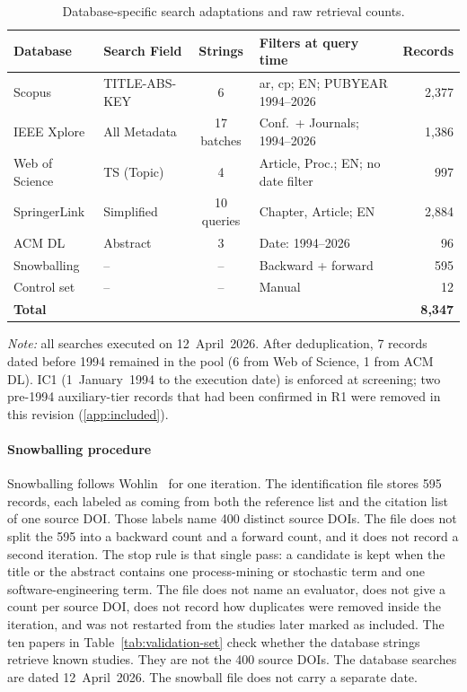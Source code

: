 \begin{table}[htbp]
\centering
\caption{Database-specific search adaptations and raw retrieval counts.}
\label{tab:db-adaptations}
\small
\setlength{\tabcolsep}{4pt}
\begin{tabular}{p{2.6cm} p{2.6cm} c p{5.0cm} r}
\toprule
\textbf{Database} & \textbf{Search Field} & \textbf{Strings} & \textbf{Filters at query time} & \textbf{Records} \\
\midrule
Scopus         & TITLE-ABS-KEY & 6         & ar, cp; EN; PUBYEAR 1994--2026          & 2{,}377 \\
IEEE Xplore    & All Metadata  & 17 batches & Conf.\ + Journals; 1994--2026         & 1{,}386 \\
Web of Science & TS (Topic)    & 4         & Article, Proc.; EN; no date filter     & 997 \\
SpringerLink   & Simplified    & 10 queries & Chapter, Article; EN                  & 2{,}884 \\
ACM DL         & Abstract      & 3         & Date: 1994--2026                       & 96 \\
Snowballing    & --            & --        & Backward + forward                     & 595 \\
Control set    & --            & --        & Manual                                 & 12 \\
\midrule
\textbf{Total} &  &  &  & \textbf{8{,}347} \\
\bottomrule
\end{tabular}

\smallskip
\footnotesize\textit{Note:} all searches executed on 12~April~2026. After
deduplication, 7 records dated before 1994 remained in the pool (6 from Web of
Science, 1 from ACM DL). IC1 (1~January~1994 to the execution date) is
enforced at screening; two pre-1994 auxiliary-tier records that had been
confirmed in R1 were removed in this revision (\ref{app:included}).
\end{table}

\paragraph{Snowballing procedure}
Snowballing follows Wohlin~\cite{Wohlin2014} for one iteration. The
identification file stores 595 records, each labeled as coming from both
the reference list and the citation list of one source DOI. Those labels
name 400 distinct source DOIs. The file does not split the 595 into a
backward count and a forward count, and it does not record a second
iteration. The stop rule is that single pass: a candidate is kept when the
title or the abstract contains one process-mining or stochastic term and
one software-engineering term. The file does not name an evaluator, does
not give a count per source DOI, does not record how duplicates were
removed inside the iteration, and was not restarted from the studies later
marked as included. The ten papers in
Table~\ref{tab:validation-set} check whether the database strings retrieve
known studies. They are not the 400 source DOIs. The database searches are
dated 12~April~2026. The snowball file does not carry a separate date.

